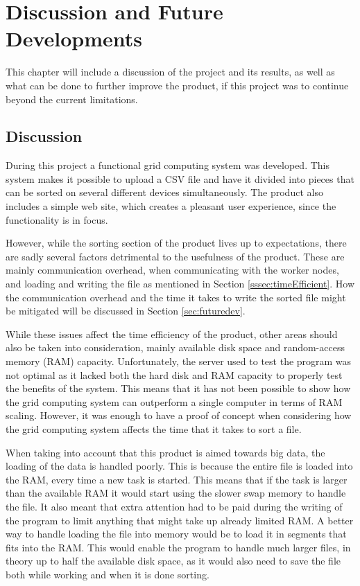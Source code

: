 \chapter{Discussion and Future Developments}
This chapter will include a discussion of the project and its results, as well as what can be done to further improve the product, if this project was to continue beyond the current limitations.

\section{Discussion}
During this project a functional grid computing system was developed. This system makes it possible to upload a CSV file and have it divided into pieces that can be sorted on several different devices simultaneously. The product also includes a simple web site, which creates a pleasant user experience, since the functionality is in focus.
 
However, while the sorting section of the product lives up to expectations, there are sadly several factors detrimental to the usefulness of the product. These are mainly communication overhead, when communicating with the worker nodes, and loading and writing the file as mentioned in Section \ref{sssec:timeEfficient}. How the communication overhead and the time it takes to write the sorted file might be mitigated will be discussed in Section \ref{sec:futuredev}. 

While these issues affect the time efficiency of the product, other areas should also be taken into consideration, mainly available disk space and random-access memory (RAM) capacity. Unfortunately, the server used to test the program was not optimal as it lacked both the hard disk and RAM capacity to properly test the benefits of the system. This means that it has not been possible to show how the grid computing system can outperform a single computer in terms of RAM scaling. However, it was enough to have a proof of concept when considering how the grid computing system affects the time that it takes to sort a file. 

When taking into account that this product is aimed towards big data, the loading of the data is handled poorly. This is because the entire file is loaded into the RAM, every time a new task is started. This means that if the task is larger than the available RAM it would start using the slower swap memory to handle the file. It also meant that extra attention had to be paid during the writing of the program to limit anything that might take up already limited RAM. A better way to handle loading the file into memory would be to load it in segments that fits into the RAM. This would enable the program to handle much larger files, in theory up to half the available disk space, as it would also need to save the file both while working and when it is done sorting. 

